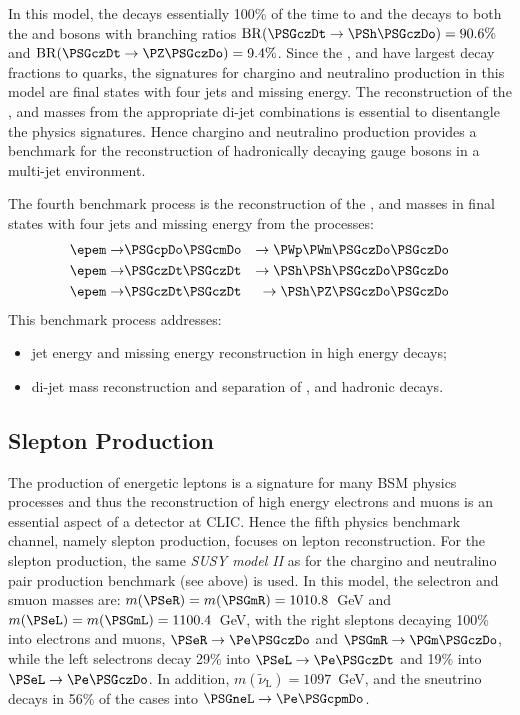In this model, the \PSGcpmDo decays essentially 100\% of the time to
\PWpm\PSGczDo and the \PSGczDt decays to both the \PZ and \PSh bosons
with branching ratios $\mathrm{BR}(\PSGczDt \rightarrow \PSh\PSGczDo) = 90.6\%$ and
$\mathrm{BR}(\PSGczDt \rightarrow \PZ\PSGczDo) = 9.4\%$. Since the \PZ, \PW and
\PSh have largest decay fractions to quarks, the signatures for chargino and
neutralino production in this model are final states with four jets and missing
energy. The reconstruction of the \PZ, \PW and \PSh masses from the
appropriate di-jet combinations is essential to disentangle the physics
signatures. Hence chargino and neutralino production provides a benchmark for
the reconstruction of hadronically decaying gauge bosons in a multi-jet
environment.

The fourth benchmark process is the reconstruction of the \PSGcpmDo,
\PSGczDo and \PSGczDt masses in final states with four jets and missing
energy from the processes:
\begin{eqnarray*}
         \epem\rightarrow & \PSGcpDo\PSGcmDo & \rightarrow\PWp\PWm\PSGczDo\PSGczDo \\
         \epem\rightarrow & \PSGczDt\PSGczDt & \rightarrow\PSh\PSh\PSGczDo\PSGczDo \\
         \epem\rightarrow & \PSGczDt\PSGczDt & \rightarrow\PSh\PZ\PSGczDo\PSGczDo
\end{eqnarray*}
This benchmark process addresses:
\begin{itemize}
   \item jet energy and missing energy reconstruction in high energy decays;
   \item di-jet mass reconstruction and separation of \PZ, \PW and \PSh hadronic decays. 
\end{itemize}
 
\subsection{Slepton Production}


The production of energetic leptons is a signature for many \acs{BSM} physics
processes and thus the reconstruction of high energy electrons and muons is an
essential aspect of a detector at CLIC\@. Hence the fifth physics benchmark
channel, namely slepton production, focuses on lepton reconstruction. For the
slepton production, the same \textit{\acs{SUSY} model II}
as for the chargino and
neutralino pair production benchmark (see above) is used. In this model, the
selectron and smuon masses are: $m(\PSeR) = m(\PSGmR) = 1010.8$~GeV and 
\mbox{$m(\PSeL) = m(\PSGmL) = 1100.4$~GeV}, with the right sleptons
decaying 100\% into electrons and muons, 
\eg $\PSeR\rightarrow\Pe\PSGczDo$ and
$\PSGmR\rightarrow\PGm\PSGczDo$, while the left selectrons decay 29\%
into $\PSeL\rightarrow \Pe \PSGczDt$ and 19\% into $\PSeL\rightarrow \Pe \PSGczDo$. 
In addition, $m(\tilde\nu_\mathrm{L})=1097$~GeV,
and the sneutrino decays in 56\% of the cases into
$ \PSGneL \to \Pe\PSGcpmDo$.

